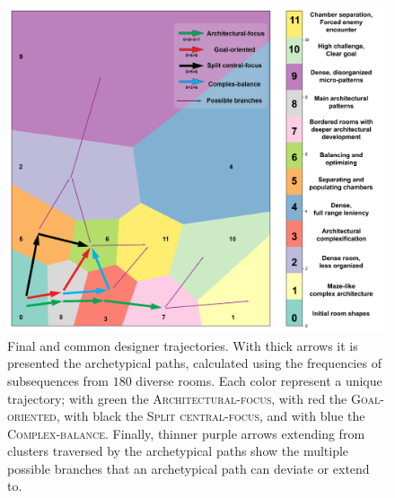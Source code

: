 


\begin{figure}[t!]
\centerline{\includegraphics[width=\textwidth]{figures/resulting-paths-FINAL.png}}
\caption{Final and common designer trajectories. With thick arrows it is presented the archetypical paths, calculated using the frequencies of subsequences from $180$ diverse rooms. Each color represent a unique trajectory; with green the \textsc{Architectural-focus}, with red the \textsc{Goal-oriented}, with black the \textsc{Split central-focus}, and with blue the \textsc{Complex-balance}. Finally, thinner purple arrows extending from clusters traversed by the archetypical paths show the multiple possible branches that an archetypical path can deviate or extend to.} \label{p6fig:finalPaths}
\end{figure}

